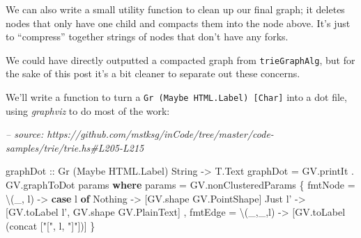 \documentclass[]{article}
\newenvironment{Shaded}{}{}
\newcommand{\CommentTok}[1]{\textcolor[rgb]{0.38,0.63,0.69}{\textit{#1}}}
\newcommand{\DataTypeTok}[1]{\textcolor[rgb]{0.56,0.13,0.00}{#1}}
\newcommand{\FunctionTok}[1]{\textcolor[rgb]{0.02,0.16,0.49}{#1}}
\newcommand{\KeywordTok}[1]{\textcolor[rgb]{0.00,0.44,0.13}{\textbf{#1}}}
\newcommand{\NormalTok}[1]{#1}
\newcommand{\OtherTok}[1]{\textcolor[rgb]{0.00,0.44,0.13}{#1}}
\newcommand{\StringTok}[1]{\textcolor[rgb]{0.25,0.44,0.63}{#1}}
\begin{document}
We can also write a small utility function to clean up our final graph; it
deletes nodes that only have one child and compacts them into the node above.
It's just to ``compress'' together strings of nodes that don't have any forks.

\begin{Shaded}
\end{Shaded}

We could have directly outputted a compacted graph from \texttt{trieGraphAlg},
but for the sake of this post it's a bit cleaner to separate out these concerns.

We'll write a function to turn a \texttt{Gr\ (Maybe\ HTML.Label)\ {[}Char{]}}
into a dot file, using \emph{graphviz} to do most of the work:

\begin{Shaded}
\begin{Highlighting}[]
\CommentTok{-- source: https://github.com/mstksg/inCode/tree/master/code-samples/trie/trie.hs#L205-L215}

\NormalTok{graphDot}
\OtherTok{    ::} \DataTypeTok{Gr}\NormalTok{ (}\DataTypeTok{Maybe} \DataTypeTok{HTML.Label}\NormalTok{) }\DataTypeTok{String}
    \OtherTok{->} \DataTypeTok{T.Text}
\NormalTok{graphDot }\FunctionTok{=}\NormalTok{ GV.printIt }\FunctionTok{.}\NormalTok{ GV.graphToDot params}
  \KeywordTok{where}
\NormalTok{    params }\FunctionTok{=}\NormalTok{ GV.nonClusteredParams}
\NormalTok{      \{ fmtNode }\FunctionTok{=}\NormalTok{ \textbackslash{}(_,  l) }\OtherTok{->} \KeywordTok{case}\NormalTok{ l }\KeywordTok{of}
          \DataTypeTok{Nothing} \OtherTok{->}\NormalTok{ [GV.shape }\DataTypeTok{GV.PointShape}\NormalTok{]}
          \DataTypeTok{Just}\NormalTok{ l' }\OtherTok{->}\NormalTok{ [GV.toLabel l', GV.shape }\DataTypeTok{GV.PlainText}\NormalTok{]}
\NormalTok{      , fmtEdge }\FunctionTok{=}\NormalTok{ \textbackslash{}(_,_,l) }\OtherTok{->}\NormalTok{ [GV.toLabel (}\FunctionTok{concat}\NormalTok{ [}\StringTok{"["}\NormalTok{, l, }\StringTok{"]"}\NormalTok{])]}
\NormalTok{      \}}
\end{Highlighting}
\end{Shaded}
\end{document}
